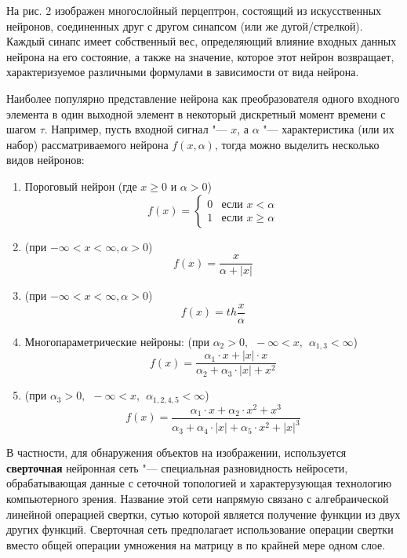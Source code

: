 \documentclass[bachelor, och, coursework]{SCWorks}
\begin{document}
        На рис. 2 изображен многослойный перцептрон, состоящий из искусственных нейронов, соединенных друг с другом синапсом (или же дугой/стрелкой). Каждый синапс имеет собственный вес, определяющий влияние входных данных нейрона на его состояние, а также на значение, которое этот нейрон возвращает, характеризуемое различными формулами в зависимости от вида нейрона.
        
        Наиболее популярно представление нейрона как преобразователя одного входного элемента в один выходной элемент в некоторый дискретный момент времени с шагом $\tau$. Например, пусть входной сигнал "--- $x$, а $\alpha$ "--- характеристика (или их набор) рассматриваемого нейрона $f(x, \alpha)$, тогда можно выделить несколько видов нейронов:
        \newpage
        \begin{enumerate}
            \item Пороговый нейрон (где $x \geq 0$ и $\alpha > 0$)
                \begin{equation*}
                    f(x) = 
                     \begin{cases}
                       0 &\text{если $x < \alpha$}\\
                       1 &\text{если $x \geq \alpha$}
                     \end{cases}
                \end{equation*}    
            \item (при $-\infty < x < \infty, \alpha > 0$) \[f(x) = \frac{x}{\alpha + | x |}\]
            \item (при $-\infty < x < \infty, \alpha > 0$) \[f(x) = th\frac{x}{\alpha}\]
            \item Многопараметрические нейроны: (при $\alpha_2 > 0, \hspace{5pt} -\infty < x, \hspace{5pt} \alpha_{1, 3} < \infty$)
                \[f(x) = \frac{\alpha_1 \cdot x + | x | \cdot x}{\alpha_2 + \alpha_3 \cdot | x | + x^2}\]
            \item (при $\alpha_3 > 0, \hspace{5pt} -\infty < x, \hspace{5pt} \alpha_{1, 2, 4, 5} < \infty$)
                \[f(x) = \frac{\alpha_1 \cdot x + \alpha_2 \cdot x^2 + x^3}{\alpha_3 + \alpha_4 \cdot | x | + \alpha_5 \cdot x^2 + | x |^3}\]
        \end{enumerate}

        В частности, для обнаружения объектов на изображении, используется \textbf{сверточная} нейронная сеть "--- специальная разновидность нейросети, обрабатывающая данные с сеточной топологией и характерузующая технологию компьютерного зрения. Название этой сети напрямую связано с алгебраической линейной операцией свертки, сутью которой является получение функции из двух других функций. Сверточная сеть предполагает использование операции свертки вместо общей операции умножения на матрицу в по крайней мере одном слое.
        
\end{document}

